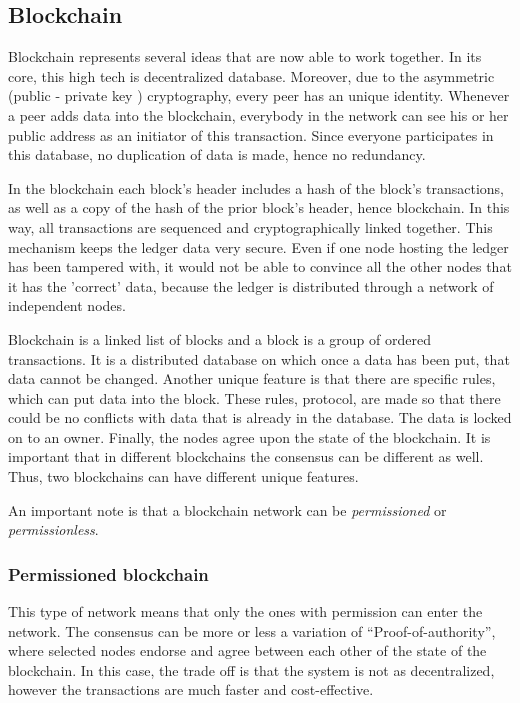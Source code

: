 \documentclass[a4paper,11pt]{report}
\begin{document}
\subsection{Blockchain}
\label{blockchain}

Blockchain represents several ideas that are now able to work together. In its core, this high tech is decentralized database. Moreover, due to the asymmetric (public - private key ) cryptography, every peer has an unique identity. Whenever a peer adds data into the blockchain, everybody in the network can see his or her public address as an initiator of this transaction. Since everyone participates in this database, no duplication of data is made, hence no redundancy. 

In the blockchain each block's header includes a hash of the block’s transactions, as well as a copy of the hash of the prior block's header, hence blockchain. In this way, all transactions are sequenced and cryptographically linked together. This mechanism keeps the ledger data very secure. Even if one node hosting the ledger has been tampered with, it would not be able to convince all the other nodes that it has the 'correct' data, because the ledger is distributed through a network of independent nodes.\cite{fabledger}
 
	Blockchain is a linked list of blocks and a block is a group of ordered transactions. It is a distributed database on which once a data has been put, that data cannot be changed. Another unique feature is that there are specific rules, which can put data into the block. These rules, protocol, are made so that there could be no conflicts with data that is already in the database. The data is locked on to an owner. Finally, the nodes agree upon the state of the blockchain.\cite{whatIsBlockchain} It is important that in different blockchains the consensus can be different as well. Thus, two blockchains can have different unique features.
	
	An important note is that a blockchain network can be \textit{permissioned} or \textit{permissionless}.

\subsubsection{Permissioned blockchain}
This type of network means that only the ones with permission can enter the network. The consensus can be more or less a variation of “Proof-of-authority”, where selected nodes endorse and agree between each other of the state of the blockchain. In this case, the trade off is that the system is not as decentralized, however the transactions are much faster and cost-effective.
\end{document}
